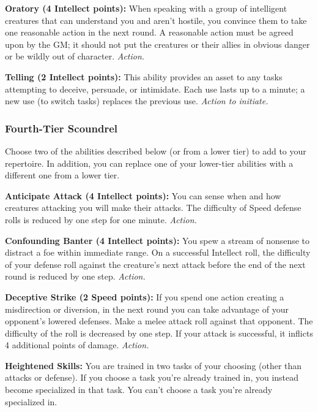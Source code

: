 \documentclass[a4paper,10pt,final,twocolumn,oneside]{book}
\newcommand{\itemAbility}[2]{\textcolor{25gray}{\textbullet\textbf{ #1:}}{ #2}\par}
\newcommand{\action}{\textit{ Action.}}
\newcommand{\actionInit}{\textit{ Action to initiate.}}
\begin{document}
\itemAbility{Oratory (4 Intellect points)}{When speaking with a group of intelligent creatures that can understand you and aren’t hostile, you convince them to take one reasonable action in the next round. A reasonable action must be agreed upon by the GM; it should not put the creatures or their allies in obvious danger or be wildly out of character.\action}

\itemAbility{Telling (2 Intellect points)}{This ability provides an asset to any tasks attempting to deceive, persuade, or intimidate. Each use lasts up to a minute; a new use (to switch tasks) replaces the previous use.\actionInit}


\subsubsection*{Fourth-Tier Scoundrel}
\label{subsub:scoundrelFourthTier}

Choose two of the abilities described below (or from a lower tier) to add to your repertoire. In addition, you can replace one of your lower-tier abilities with a different one from a lower tier.

\itemAbility{Anticipate Attack (4 Intellect points)}{You can sense when and how creatures attacking you will make their attacks. The difficulty of Speed defense rolls is reduced by one step for one minute.\action}

\itemAbility{Confounding Banter (4 Intellect points)}{You spew a stream of nonsense to distract a foe within immediate range. On a successful Intellect roll, the difficulty of your defense roll against the creature’s next attack before the end of the next round is reduced by one step.\action}

\itemAbility{Deceptive Strike (2 Speed points)}{If you spend one action creating a misdirection or diversion, in the next round you can take advantage of your opponent’s lowered defenses. Make a melee attack roll against that opponent. The difficulty of the roll is decreased by one step. If your attack is successful, it inflicts 4 additional points of damage.\action}

\itemAbility{Heightened Skills}{You are trained in two tasks of your choosing (other than attacks or defense). If you choose a task you’re already trained in, you instead become specialized in that task. You can’t choose a task you’re already specialized in.}
\end{document}
